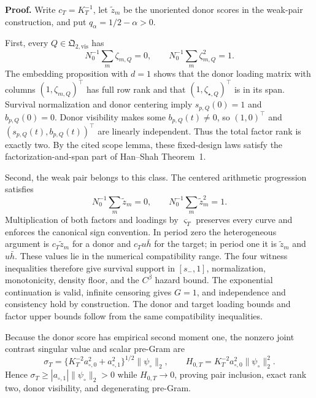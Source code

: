 \textbf{Proof.}
Write \(c_T=K_T^{-1}\), let \(\widetilde z_m\) be the unoriented donor scores in the weak-pair construction, and put \(q_\alpha=1/2-\alpha>0\).

First, every \(Q\in\mathfrak Q_{2,\mathrm{vis}}\) has
\[
 N_0^{-1}\sum_m\zeta_{m,Q}=0,
 \qquad N_0^{-1}\sum_m\zeta_{m,Q}^2=1.                   \tag{1}
\]
The embedding proposition with \(d=1\) shows that the donor loading matrix with columns \((1,\zeta_{m,Q})^\top\) has full row rank and that \((1,\zeta_{\star,Q})^\top\) is in its span. Survival normalization and donor centering imply \(s_{p,Q}(0)=1\) and \(b_{p,Q}(0)=0\). Donor visibility makes some \(b_{p,Q}(t)\ne0\), so \((1,0)^\top\) and \((s_{p,Q}(t),b_{p,Q}(t))^\top\) are linearly independent. Thus the total factor rank is exactly two. By the cited scope lemma, these fixed-design laws satisfy the factorization-and-span part of Han--Shah Theorem~1.

Second, the weak pair belongs to this class. The centered arithmetic progression satisfies
\[
 N_0^{-1}\sum_m\widetilde z_m=0,
 \qquad N_0^{-1}\sum_m\widetilde z_m^2=1.                 \tag{2}
\]
Multiplication of both factors and loadings by \(\varsigma_T\) preserves every curve and enforces the canonical sign convention. In period zero the heterogeneous argument is \(c_T\widetilde z_m\) for a donor and \(c_Tu\bar h\) for the target; in period one it is \(\widetilde z_m\) and \(u\bar h\). These values lie in the numerical compatibility range. The four witness inequalities therefore give survival support in \([s_-,1]\), normalization, monotonicity, density floor, and the \(C^\beta\) hazard bound. The exponential continuation is valid, infinite censoring gives \(G=1\), and independence and consistency hold by construction. The donor and target loading bounds and factor upper bounds follow from the same compatibility inequalities.

Because the donor score has empirical second moment one, the nonzero joint contrast singular value and scalar pre-Gram are
\[
 \sigma_T=\{K_T^{-2}a_{\circ,0}^2+a_{\circ,1}^2\}^{1/2}
 \|\psi_\circ\|_2,
 \qquad H_{0,T}=K_T^{-2}a_{\circ,0}^2\|\psi_\circ\|_2^2. \tag{3}
\]
Hence \(\sigma_T\ge|a_{\circ,1}|\|\psi_\circ\|_2>0\) while \(H_{0,T}\to0\), proving pair inclusion, exact rank two, donor visibility, and degenerating pre-Gram.

